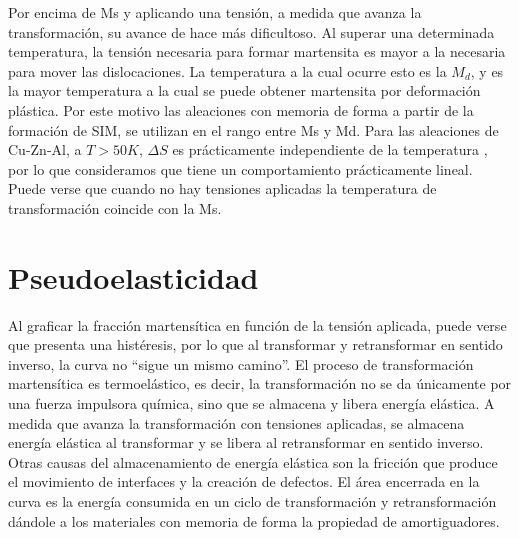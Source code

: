 \documentclass[a4paper,12pt,fleqn,twoside,openany]{book}
\begin{document}



Por encima de Ms y aplicando una tensión, a medida que avanza la transformación, su avance de hace más dificultoso. Al superar una determinada temperatura, la tensión necesaria para 
formar martensita es mayor a la necesaria para mover las dislocaciones. La temperatura a la cual ocurre esto es la $M_d$, y es la mayor temperatura a la cual se puede 
obtener martensita por deformación plástica. Por este motivo las aleaciones con memoria de forma a partir de la formación de SIM, se utilizan en el rango entre Ms y Md.
Para las aleaciones de Cu-Zn-Al, a $T > 50K$, $\Delta S$ es prácticamente independiente de la temperatura \cite{pierre}, por lo que consideramos que tiene un comportamiento 
prácticamente lineal. Puede verse que cuando no hay tensiones aplicadas la temperatura de transformación coincide con la Ms.



\section{Pseudoelasticidad}

Al graficar la fracción martensítica en función de la tensión aplicada, puede verse que presenta una histéresis, por lo que al transformar y 
retransformar en sentido inverso, la curva no “sigue un mismo camino”. El proceso de transformación martensítica es termoelástico, es decir, la transformación 
no se da únicamente por una fuerza impulsora química, sino que se almacena y libera energía elástica. A medida que avanza la transformación con tensiones aplicadas, 
se almacena energía elástica al transformar y se libera al retransformar en sentido inverso. Otras causas del almacenamiento de energía elástica son la fricción que produce el 
movimiento de interfaces y la creación de defectos. El área encerrada en la curva es la energía consumida en un ciclo de transformación y retransformación dándole a los 
materiales con memoria de forma la propiedad de amortiguadores.

\end{document}
